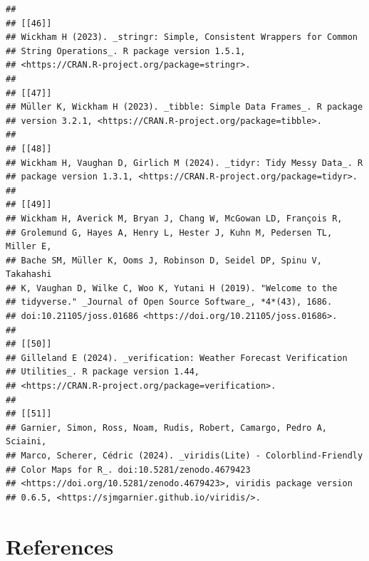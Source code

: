 \documentclass[a4paper, nobind]{templates/ociamthesis}
\begin{document}
\begin{verbatim}
## 
## [[46]]
## Wickham H (2023). _stringr: Simple, Consistent Wrappers for Common
## String Operations_. R package version 1.5.1,
## <https://CRAN.R-project.org/package=stringr>.
## 
## [[47]]
## Müller K, Wickham H (2023). _tibble: Simple Data Frames_. R package
## version 3.2.1, <https://CRAN.R-project.org/package=tibble>.
## 
## [[48]]
## Wickham H, Vaughan D, Girlich M (2024). _tidyr: Tidy Messy Data_. R
## package version 1.3.1, <https://CRAN.R-project.org/package=tidyr>.
## 
## [[49]]
## Wickham H, Averick M, Bryan J, Chang W, McGowan LD, François R,
## Grolemund G, Hayes A, Henry L, Hester J, Kuhn M, Pedersen TL, Miller E,
## Bache SM, Müller K, Ooms J, Robinson D, Seidel DP, Spinu V, Takahashi
## K, Vaughan D, Wilke C, Woo K, Yutani H (2019). "Welcome to the
## tidyverse." _Journal of Open Source Software_, *4*(43), 1686.
## doi:10.21105/joss.01686 <https://doi.org/10.21105/joss.01686>.
## 
## [[50]]
## Gilleland E (2024). _verification: Weather Forecast Verification
## Utilities_. R package version 1.44,
## <https://CRAN.R-project.org/package=verification>.
## 
## [[51]]
## Garnier, Simon, Ross, Noam, Rudis, Robert, Camargo, Pedro A, Sciaini,
## Marco, Scherer, Cédric (2024). _viridis(Lite) - Colorblind-Friendly
## Color Maps for R_. doi:10.5281/zenodo.4679423
## <https://doi.org/10.5281/zenodo.4679423>, viridis package version
## 0.6.5, <https://sjmgarnier.github.io/viridis/>.
\end{verbatim}

\chapter*{References}\label{references}



\setlength{\baselineskip}{0pt} %

{\renewcommand*\MakeUppercase[1]{#1}%
\printbibliography[heading=none]}
\end{document}
